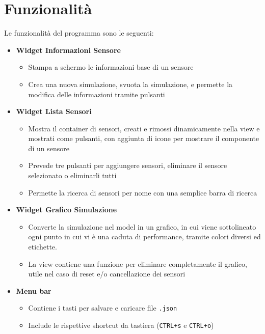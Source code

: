 \documentclass[10pt]{article}
\begin{document}
\section{Funzionalità}
Le funzionalità del programma sono le seguenti:
\begin{itemize}
    \item \textbf{Widget Informazioni Sensore}
    \begin{itemize}
        \item Stampa a schermo le informazioni base di un sensore
        \item Crea una nuova simulazione, svuota la simulazione, e
        permette la modifica delle informazioni tramite pulsanti
    \end{itemize}
    \item \textbf{Widget Lista Sensori}
    \begin{itemize}
        \item Mostra il container di sensori, creati e rimossi dinamicamente
        nella view e mostrati come pulsanti, con aggiunta di icone per mostrare
        il componente di un sensore
        \item Prevede tre pulsanti per aggiungere sensori, eliminare il sensore selezionato
        o eliminarli tutti
        \item Permette la ricerca di sensori per nome con una semplice barra di ricerca
    \end{itemize}
    \item \textbf{Widget Grafico Simulazione}
    \begin{itemize}
        \item Converte la simulazione nel model in un grafico, in cui viene
        sottolineato ogni punto in cui vi è una caduta di performance, tramite
        colori diversi ed etichette.
        \item La view contiene una funzione per eliminare completamente il grafico,
        utile nel caso di reset e/o cancellazione dei sensori
    \end{itemize}
    \item \textbf{Menu bar}
    \begin{itemize}
        \item Contiene i tasti per salvare e caricare file \texttt{.json}
        \item Include le rispettive shortcut da tastiera (\texttt{CTRL+s} e \texttt{CTRL+o})
    \end{itemize}
\end{itemize}
\end{document}
